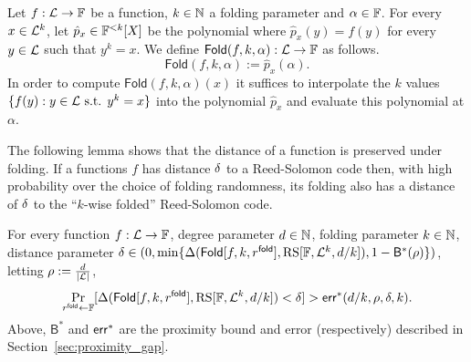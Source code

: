 \begin{definition}\label{def:fn_folding}
\leanok
Let $f:\mathcal{L}\rightarrow\mathbb{F}$ be a function, $k\in\mathbb{N}$ a folding parameter and $\alpha\in\mathbb{F}$. For every $x\in{\mathcal{L}}^k$, let $\hat{p}_x\in\mathbb{F}^{<k}[X]$ be the polynomial where $\hat{p}_x(y)=f(y)$ for every $y\in{\mathcal{L}}$ such that $y^k=x$. We define $\mathsf{Fold}(f,k,\alpha):\mathcal{L}\rightarrow\mathbb{F}$ as follows.
\[
    \mathsf{Fold}(f,k,\alpha):=\hat{p}_x(\alpha).
\]
In order to compute $\mathsf{Fold}(f,k,\alpha)(x)$ it suffices to interpolate the $k$ values $\{f(y):y\in\mathcal{L}\text{ s.t. }y^k=x\}$ into the polynomial $\hat{p}_x$ and evaluate this polynomial at $\alpha$.
\end{definition}

The following lemma shows that the distance of a function is preserved under folding. If a functions $f$ has distance $\delta$ to a Reed-Solomon code then, with high probability over the choice of folding randomness, its folding also has a distance of $\delta$ to the ``$k$-wise folded'' Reed-Solomon code.

\begin{lemma}\label{lemma:folding}
\leanok
{}
    For every function $f:\mathcal{L}\rightarrow\mathbb{F}$, degree parameter $d\in\mathbb{N}$, folding parameter $k\in\mathbb{N}$, distance parameter $\delta\in(0,\min\{{\Delta(\mathsf{Fold}[f,k,r^{\mathsf{fold}}],\mathrm{RS}[\mathbb{F},{\mathcal{L}}^k, d/k]),1-{\mathsf{B}}^*(\rho)}\})$, letting $\rho:=\frac{d}{|\mathcal{L}|}$,
    \[
        \Pr_{r^{\mathsf{fold}}\gets\mathbb{F}}[\Delta(\mathsf{Fold}[f,k,r^{\mathsf{fold}}],\mathrm{RS}[\mathbb{F},{\mathcal{L}}^k, d/k])<\delta]>\mathsf{err}^*(d/k,\rho,\delta,k).
    \]
    Above, ${\mathsf{B}}^*$ and ${\mathsf{err}}^*$ are the proximity bound and error (respectively) described in Section~\ref{sec:proximity_gap}.
\end{lemma}
